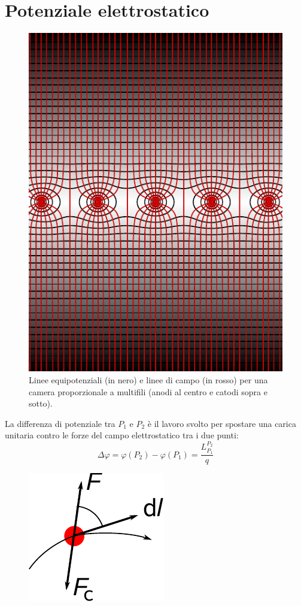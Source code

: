 \section{Potenziale elettrostatico}
\begin{figure}[htp]
  \centering
  \includegraphics{immagini/fisica2/MWPC}
  \caption{Linee equipotenziali (in nero) e linee di campo (in rosso) per una camera proporzionale a multifili (anodi al centro e catodi sopra e sotto).}
\end{figure}
\begin{Def}
  La differenza di potenziale tra $P_1$ e $P_2$ è il lavoro svolto per spostare una carica unitaria contro le forze del campo elettrostatico tra i due punti:
  \begin{equation}
    \Delta\varphi=\varphi(P_2)-\varphi(P_1)=\frac{L_{P_1}^{P_2}}{q}
  \end{equation}
\end{Def}
\begin{figure}[htp]
  \centering
  \includegraphics{immagini/fisica2/lavoro_campo}
\end{figure}

